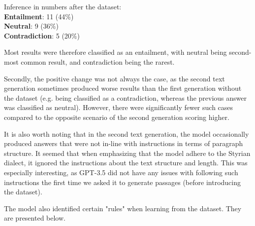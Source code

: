\documentclass[fleqn,moreauthors,10pt]{ds_report}
\begin{document}
\vspace{\baselineskip}
Inference in numbers after the dataset:
\n\\ \textbf{Entailment}: 11 (44\%)
\textbf{\n\\Neutral}: 9 (36\%)
\textbf{\n\\Contradiction}: 5 (20\%)

\vspace{\baselineskip}
Most results were therefore classified as an entailment, with neutral being second-most common result, and contradiction being the rarest.

Secondly, the positive change was not always the case, as the second text generation sometimes produced worse results than the first generation without the dataset (e.g. being classified as a contradiction, whereas the previous answer was classified as neutral). However, there were significantly fewer such cases compared to the opposite scenario of the second generation scoring higher.

It is also worth noting that in the second text generation, the model occasionally produced answers that were not in-line with instructions in terms of paragraph structure. It seemed that when emphasizing that the model adhere to the Styrian dialect, it ignored the instructions about the text structure and length. This was especially interesting, as GPT-3.5 did not have any issues with following such instructions the first time we asked it to generate passages (before introducing the dataset).

The model also identified certain "rules" when learning from the dataset. They are presented below.
\end{document}
